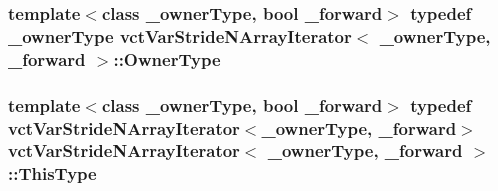 \hypertarget{classvct_var_stride_n_array_iterator_ace0aaa36ae04ab580bdc4b41540f5da8}{
\subsubsection[{Owner\-Type}]{\setlength{\rightskip}{0pt plus 5cm}template$<$class \-\_\-owner\-Type, bool \-\_\-forward$>$ typedef \-\_\-owner\-Type {\bf vct\-Var\-Stride\-N\-Array\-Iterator}$<$ \-\_\-owner\-Type, \-\_\-forward $>$\-::{\bf Owner\-Type}}}\label{classvct_var_stride_n_array_iterator_ace0aaa36ae04ab580bdc4b41540f5da8}
\hypertarget{classvct_var_stride_n_array_iterator_ae02517903d76b5ea390357e329d7d234}{
\subsubsection[{This\-Type}]{\setlength{\rightskip}{0pt plus 5cm}template$<$class \-\_\-owner\-Type, bool \-\_\-forward$>$ typedef {\bf vct\-Var\-Stride\-N\-Array\-Iterator}$<$\-\_\-owner\-Type, \-\_\-forward$>$ {\bf vct\-Var\-Stride\-N\-Array\-Iterator}$<$ \-\_\-owner\-Type, \-\_\-forward $>$\-::{\bf This\-Type}}}\label{classvct_var_stride_n_array_iterator_ae02517903d76b5ea390357e329d7d234}


